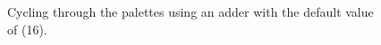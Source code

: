 \begin{figure}[H]
{  }\caption*{Cycling through the palettes using an adder with the default value of (16).}
\end{figure}
